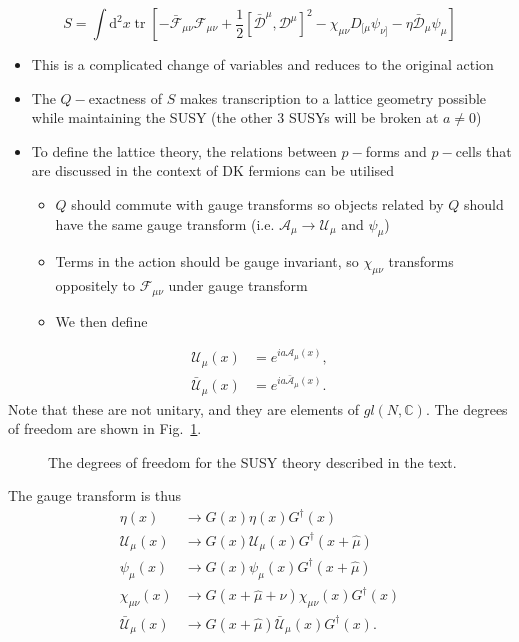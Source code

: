 \begin{equation}
    S = \int \text{d}^2 x \operatorname{tr}\left[ - \bar{\mathcal{F}}_{\mu \nu}\mathcal{F}_{\mu \nu} + \frac{1}{2}[\bar{\mathcal{D}}^\mu, \mathcal{D}^\mu]^2 - \chi_{\mu \nu} D_{[\mu}\psi_{\nu]} - \eta \bar{\mathcal{D}}_\mu \psi_\mu\right]
\end{equation}
\begin{itemize}
    \item This is a complicated change of variables and reduces to the original action
    \item The $Q-$exactness of $S$ makes transcription to a lattice geometry possible while maintaining the SUSY (the other $3$ SUSYs will be broken at $a \neq 0$)
    \item To define the lattice theory, the relations between $p-$forms and $p-$cells that are discussed in the context of DK fermions can be utilised
    \begin{itemize}
        \item $Q$ should commute with gauge transforms so objects related by $Q$ should have the same gauge transform (i.e. $\mathcal{A}_\mu \to \mathcal{U}_\mu$ and $\psi_\mu$)
        \item Terms in the action should be gauge invariant, so $\chi_{\mu \nu}$ transforms oppositely to $\mathcal{F}_{\mu \nu}$ under gauge transform
        \item We then define
    \end{itemize}
\end{itemize}
\begin{align}
    \mathcal{U}_\mu(x) &= e^{i a \mathcal{A}_\mu(x)}, \nonumber \\ 
    \bar{\mathcal{U}}_\mu(x) &= e^{i a \bar{\mathcal{A}}_\mu(x)}.
\end{align}
Note that these are not unitary, and they are elements of $gl(N, \mathbb{C})$. The degrees of freedom are shown in Fig.~\ref{fig:susydof}.
\begin{figure}
\centering
{}
\caption{The degrees of freedom for the SUSY theory described in the text.}
\label{fig:susydof}
\end{figure}
The gauge transform is thus
\begin{align}
    \eta(x) &\to G(x) \eta(x) G^\dagger(x) \\
    \mathcal{U}_\mu(x) &\to G(x) \mathcal{U}_\mu(x) G^\dagger(x + \hat{\mu}) \\
    \psi_\mu(x) &\to G(x) \psi_\mu(x) G^\dagger(x + \hat{\mu}) \\
    \chi_{\mu \nu}(x) & \to G(x + \hat{\mu} + \hat{\nu})\chi_{\mu \nu}(x)G^\dagger(x) \\
    \bar{\mathcal{U}}_\mu(x) &\to G(x + \hat{\mu}) \bar{\mathcal{U}}_\mu(x) G^\dagger(x).
\end{align}
